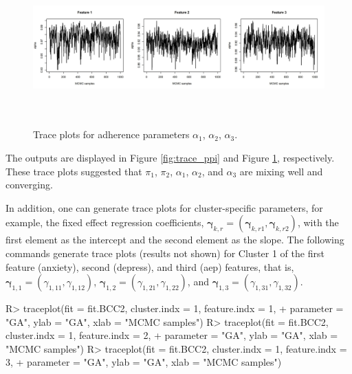 \begin{figure}[h]
\centering
\includegraphics[width=\textwidth,height=6cm]{./Figures/trace_alpha.JPEG}
\caption{\label{fig:trace_alpha}  Trace plots for adherence parameters $\alpha_1$, $\alpha_2$, $\alpha_3$.}
\end{figure}

The outputs are displayed in Figure \ref{fig:trace_ppi} and Figure \ref{fig:trace_alpha}, respectively. These trace plots suggested that $\pi_1$, $\pi_2$, $\alpha_1$, $\alpha_2$, and $\alpha_3$ are mixing well and converging. 

In addition, one can generate trace plots for cluster-specific parameters, for example, the fixed effect regression coefficients, $\boldsymbol{\gamma}_{k, r} = (\boldsymbol{\gamma}_{k, r1}, \boldsymbol{\gamma}_{k, r2})$, with the first element as the intercept and the second element as the slope. The following commands generate trace plots (results not shown) for Cluster 1 of the first feature (anxiety), second (depress), and third (aep) features, that is,  $\boldsymbol{\gamma}_{1,1} = (\gamma_{1,11}, \gamma_{1,12})$,  $\boldsymbol{\gamma}_{1,2} = (\gamma_{1,21}, \gamma_{1,22})$, and $\boldsymbol{\gamma}_{1,3} = (\gamma_{1,31}, \gamma_{1,32})$. 

\begin{example}
R> traceplot(fit = fit.BCC2, cluster.indx = 1, feature.indx = 1,
+        parameter = "GA", ylab = "GA", xlab = "MCMC samples")
R> traceplot(fit = fit.BCC2, cluster.indx = 1, feature.indx = 2,
+        parameter = "GA", ylab = "GA", xlab = "MCMC samples")
R> traceplot(fit = fit.BCC2, cluster.indx = 1, feature.indx = 3,
+        parameter = "GA", ylab = "GA", xlab = "MCMC samples")
\end{example} 


